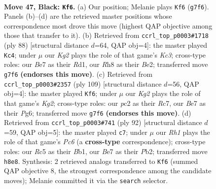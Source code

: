 \documentclass[11pt]{article}
\begin{document}
\clearpage

\begin{figure}[p]\centering
\begin{subfigure}{0.46\textwidth}\centering
\resizebox{\linewidth}{!}{%
\newchessgame
\chessboard[
  setfen={7r/p3b1kp/P6n/2r5/8/1Pp3BP/R1P1B1P1/1R5K b - - 2 47},
  showmover=false,
  pgfstyle=straightmove, color=movearrow, markmove={g7-f6}
]}
\caption{}
\end{subfigure}\hfill
\begin{subfigure}{0.46\textwidth}\centering
\resizebox{\linewidth}{!}{%
\newchessgame
\chessboard[
  setfen={2r3k1/5pp1/2n1p2p/2P3b1/6P1/1NK4P/1P2B3/3R4 w - - 1 45},
  showmover=false,
  pgfstyle=straightmove, color=movearrow, markmove={c3-c4}
]}
\caption{}
\end{subfigure}
\\[4pt]
\begin{subfigure}{0.46\textwidth}\centering
\resizebox{\linewidth}{!}{%
\newchessgame
\chessboard[
  setfen={3R4/2r1p1k1/6p1/2n4p/p1P2P1P/5KP1/P1R1B3/1r6 b - - 32 55},
  showmover=false,
  pgfstyle=straightmove, color=movearrow, markmove={g7-f6}
]}
\caption{}
\end{subfigure}\hfill
\begin{subfigure}{0.46\textwidth}\centering
\resizebox{\linewidth}{!}{%
\newchessgame
\chessboard[
  setfen={r4k2/5pp1/1RP1b2p/3p3P/p7/5PP1/1P4K1/1B6 w - - 1 47},
  showmover=false,
  pgfstyle=straightmove, color=movearrow, markmove={c6-c7}
]}
\caption{}
\end{subfigure}
\caption{\textbf{Move 47, Black: \texttt{Kf6}.} (a) Our position; Melanie plays \texttt{Kf6} (\texttt{g7f6}). Panels (b)--(d) are the retrieved master positions whose correspondence most drove this move (highest QAP objective among those that transfer to it). (b) Retrieved from \texttt{ccrl\_top\_p0003\#1718} (ply 88) [structural distance $d$=64, QAP obj=4]: the master played \texttt{Kc4}; under $\mu$ our \emph{Kg2} plays the role of that game's \emph{Kc3}; cross-type roles: our \emph{B}e7 as their \emph{R}d1, our \emph{R}h8 as their \emph{B}e2; transferred move \texttt{g7f6} \textbf{(endorses this move)}. (c) Retrieved from \texttt{ccrl\_top\_p0003\#2357} (ply 109) [structural distance $d$=56, QAP obj=4]: the master played \texttt{Kf6}; under $\mu$ our \emph{Kg2} plays the role of that game's \emph{Kg2}; cross-type roles: our \emph{p}c2 as their \emph{R}c7, our \emph{B}e7 as their \emph{P}g6; transferred move \texttt{g7f6} \textbf{(endorses this move)}. (d) Retrieved from \texttt{ccrl\_top\_p0003\#741} (ply 92) [structural distance $d$=59, QAP obj=5]: the master played \texttt{c7}; under $\mu$ our \emph{Rh1} plays the role of that game's \emph{Pc6} (a \textbf{cross-type} correspondence); cross-type roles: our \emph{R}c5 as their \emph{B}b1, our \emph{B}e7 as their \emph{P}b2; transferred move \texttt{h8e8}. Synthesis: 2 retrieved analogs transferred to \texttt{Kf6} (summed QAP objective 8, the strongest correspondence among the candidate moves); Melanie committed it via the \texttt{search} selector.}
\label{fig:thought-m93}
\end{figure}
\end{document}
